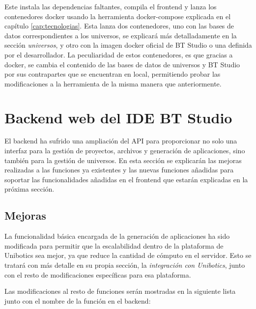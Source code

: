 Este instala las dependencias faltantes, compila el frontend y lanza los contenedores docker usando la herramienta docker-compose explicada en el capítulo \ref{cap:tecnologias}. Esta lanza dos contenedores, uno con las bases de datos correspondientes a los universos, se explicará más detalladamente en la sección \textit{universos}, y otro con la imagen docker oficial de BT Studio o una definida por el desarrollador. La peculiaridad de estos contenedores, es que gracias a docker, se cambia el contenido de las bases de datos de universos y BT Studio por sus contrapartes que se encuentran en local, permitiendo probar las modificaciones a la herramienta de la misma manera que anteriormente.

\section{Backend web del IDE BT Studio}

El backend ha sufrido una ampliación del API para proporcionar no solo una interfaz para la gestión de proyectos, archivos y generación de aplicaciones, sino también para la gestión de universos. En esta sección se explicarán las mejoras realizadas a las funciones ya existentes y las nuevas funciones añadidas para soportar las funcionalidades añadidas en el frontend que estarán explicadas en la próxima sección. 

\subsection{Mejoras}

La funcionalidad básica encargada de la generación de aplicaciones ha sido modificada para permitir que la escalabilidad dentro de la plataforma de Unibotics sea mejor, ya que reduce la cantidad de cómputo en el servidor. Esto se tratará con más detalle en su propia sección, la \textit{integración con Unibotics}, junto con el resto de modificaciones específicas para esa plataforma.

Las modificaciones al resto de funciones serán mostradas en la siguiente lista junto con el nombre de la función en el backend:

